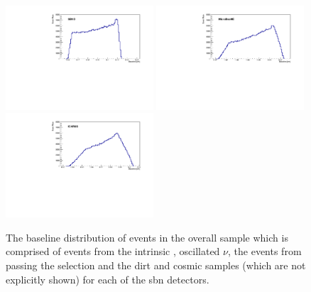   \begin{figure}
    \centering
    \includegraphics[width = 0.49\textwidth]{figures-chap5/SBND_nue.pdf}
    \includegraphics[width = 0.49\textwidth]{figures-chap5/MicroBooNE_nue.pdf}
    \includegraphics[width = 0.49\textwidth]{figures-chap5/ICARUS_nue.pdf}
    \captionsetup{width=0.45\textwidth}
    \parbox[b]{0.49\textwidth}%
    {
    \caption[The overall \nue baseline distributions.]{The baseline distribution of events in the overall \nue sample which is comprised of events from the intrinsic \nue, oscillated $\nu$, the \numu events from passing the \nue selection and the dirt and cosmic samples (which are not explicitly shown) for each of the \gls{sbn} detectors.}
    \label{fig:nue_baseline}
    }
\end{figure}

